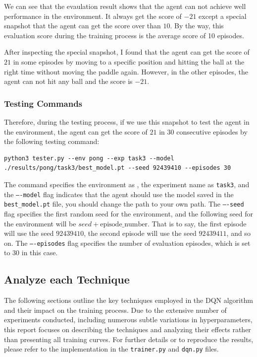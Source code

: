 We can see that the evaulation result shows that the agent can not achieve well performance in the \pong environment. It always get the score of $-21$ except a special snapshot that the agent can get the score over than $10$.
By the way, this evaluation score during the training process is the average score of 10 episodes.

After inspecting the special snapshot, I found that the agent can get the score of $21$ in some episodes by moving to a specific position and hitting the ball at the right time without moving the paddle again.
However, in the other episodes, the agent can not hit any ball and the score is $-21$.

\subsubsection{Testing Commands}

Therefore, during the testing process, if we use this snapshot to test the agent in the \pong environment, the agent can get the score of $21$ in 30 consecutive episodes by the following testing command:
\begin{verbatim}
python3 tester.py --env pong --exp task3 --model ./results/pong/task3/best_model.pt --seed 92439410 --episodes 30
\end{verbatim}

The command specifies the environment as \pong, the experiment name as \texttt{task3}, and the \texttt{----model} flag indicates that the agent should use the model saved in the \texttt{best\_model.pt} file, you should change the path to your own path.
The \texttt{----seed} flag specifies the first random seed for the environment, and the following seed for the environment will be $seed + \text{episode\_number}$. That is to say, the first episode will use the seed $92439410$, the second episode will use the seed $92439411$, and so on.
The \texttt{----episodes} flag specifies the number of evaluation episodes, which is set to $30$ in this case.

\subsection{Analyze each Technique}

The following sections outline the key techniques employed in the DQN algorithm and their impact on the training process.
Due to the extensive number of experiments conducted, including numerous subtle variations in hyperparameters, this report focuses on describing the techniques and analyzing their effects rather than presenting all training curves.
For further details or to reproduce the results, please refer to the implementation in the \texttt{trainer.py} and \texttt{dqn.py} files.

